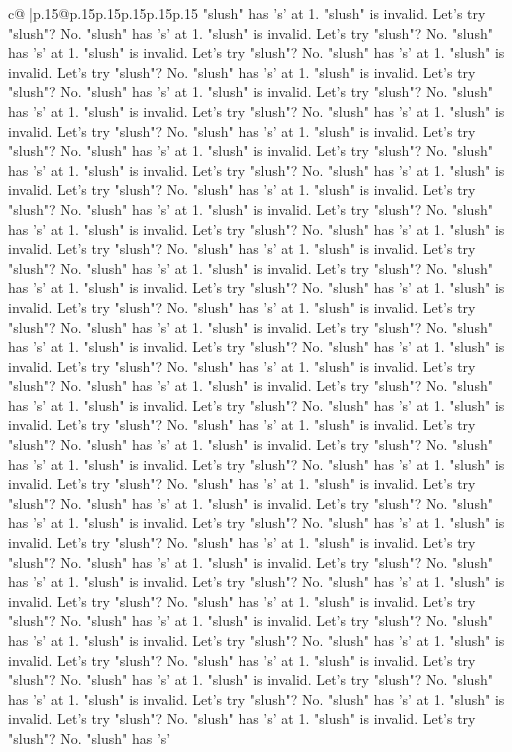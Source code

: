 \documentclass{article}
\begin{document}
{\begin{supertabular}{c@{$\;$}|p{.15\linewidth}@{}p{.15\linewidth}p{.15\linewidth}p{.15\linewidth}p{.15\linewidth}p{.15\linewidth}}
{{{"slush" has 's' at 1. "slush" is invalid. Let's try "slush"? No. "slush" has 's' at 1. "slush" is invalid. Let's try "slush"? No. "slush" has 's' at 1. "slush" is invalid. Let's try "slush"? No. "slush" has 's' at 1. "slush" is invalid. Let's try "slush"? No. "slush" has 's' at 1. "slush" is invalid. Let's try "slush"? No. "slush" has 's' at 1. "slush" is invalid. Let's try "slush"? No. "slush" has 's' at 1. "slush" is invalid. Let's try "slush"? No. "slush" has 's' at 1. "slush" is invalid. Let's try "slush"? No. "slush" has 's' at 1. "slush" is invalid. Let's try "slush"? No. "slush" has 's' at 1. "slush" is invalid. Let's try "slush"? No. "slush" has 's' at 1. "slush" is invalid. Let's try "slush"? No. "slush" has 's' at 1. "slush" is invalid. Let's try "slush"? No. "slush" has 's' at 1. "slush" is invalid. Let's try "slush"? No. "slush" has 's' at 1. "slush" is invalid. Let's try "slush"? No. "slush" has 's' at 1. "slush" is invalid. Let's try "slush"? No. "slush" has 's' at 1. "slush" is invalid. Let's try "slush"? No. "slush" has 's' at 1. "slush" is invalid. Let's try "slush"? No. "slush" has 's' at 1. "slush" is invalid. Let's try "slush"? No. "slush" has 's' at 1. "slush" is invalid. Let's try "slush"? No. "slush" has 's' at 1. "slush" is invalid. Let's try "slush"? No. "slush" has 's' at 1. "slush" is invalid. Let's try "slush"? No. "slush" has 's' at 1. "slush" is invalid. Let's try "slush"? No. "slush" has 's' at 1. "slush" is invalid. Let's try "slush"? No. "slush" has 's' at 1. "slush" is invalid. Let's try "slush"? No. "slush" has 's' at 1. "slush" is invalid. Let's try "slush"? No. "slush" has 's' at 1. "slush" is invalid. Let's try "slush"? No. "slush" has 's' at 1. "slush" is invalid. Let's try "slush"? No. "slush" has 's' at 1. "slush" is invalid. Let's try "slush"? No. "slush" has 's' at 1. "slush" is invalid. Let's try "slush"? No. "slush" has 's' at 1. "slush" is invalid. Let's try "slush"? No. "slush" has 's' at 1. "slush" is invalid. Let's try "slush"? No. "slush" has 's' at 1. "slush" is invalid. Let's try "slush"? No. "slush" has 's' at 1. "slush" is invalid. Let's try "slush"? No. "slush" has 's' at 1. "slush" is invalid. Let's try "slush"? No. "slush" has 's' at 1. "slush" is invalid. Let's try "slush"? No. "slush" has 's' at 1. "slush" is invalid. Let's try "slush"? No. "slush" has 's' at 1. "slush" is invalid. Let's try "slush"? No. "slush" has 's' at 1. "slush" is invalid. Let's try "slush"? No. "slush" has 's' at 1. "slush" is invalid. Let's try "slush"? No. "slush" has 's' at 1. "slush" is invalid. Let's try "slush"? No. "slush" has 's' at 1. "slush" is invalid. Let's try "slush"? No. "slush" has 's' at 1. "slush" is invalid. Let's try "slush"? No. "slush" has 's' at 1. "slush" is invalid. Let's try "slush"? No. "slush" has 's' at 1. "slush" is invalid. Let's try "slush"? No. "slush" has 's' at 1. "slush" is invalid. Let's try "slush"? No. "slush" has 's' at 1. "slush" is invalid. Let's try "slush"? No. "slush" has 's' at 1. "slush" is invalid. Let's try "slush"? No. "slush" has 's' at 1. "slush" is invalid. Let's try "slush"? No. "slush" has 's' at 1. "slush" is invalid. Let's try "slush"? No. "slush" has 's' }}}
\end{supertabular}}
\end{document}
